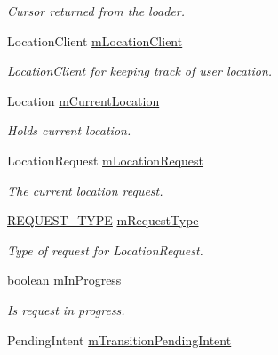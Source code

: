 \begin{DoxyCompactItemize}
\begin{DoxyCompactList}\small\item\em Cursor returned from the loader. \end{DoxyCompactList}\item 
Location\+Client \hyperlink{classuk_1_1ac_1_1swan_1_1digitaltrails_1_1activities_1_1_map_activity_ad65b4445612c08eb8fe55fde76dc3a01}{m\+Location\+Client}
\begin{DoxyCompactList}\small\item\em Location\+Client for keeping track of user location. \end{DoxyCompactList}\item 
Location \hyperlink{classuk_1_1ac_1_1swan_1_1digitaltrails_1_1activities_1_1_map_activity_a6bee4f44af3d6931f7a9d418b59b6262}{m\+Current\+Location}
\begin{DoxyCompactList}\small\item\em Holds current location. \end{DoxyCompactList}\item 
Location\+Request \hyperlink{classuk_1_1ac_1_1swan_1_1digitaltrails_1_1activities_1_1_map_activity_a277671a16bab76f50d1fe79d675f4128}{m\+Location\+Request}
\begin{DoxyCompactList}\small\item\em The current location request. \end{DoxyCompactList}\item 
\hyperlink{enumuk_1_1ac_1_1swan_1_1digitaltrails_1_1activities_1_1_map_activity_1_1_r_e_q_u_e_s_t___t_y_p_e}{R\+E\+Q\+U\+E\+S\+T\+\_\+\+T\+Y\+P\+E} \hyperlink{classuk_1_1ac_1_1swan_1_1digitaltrails_1_1activities_1_1_map_activity_a7ed4860060db37b8cc7752265331b5ba}{m\+Request\+Type}
\begin{DoxyCompactList}\small\item\em Type of request for Location\+Request. \end{DoxyCompactList}\item 
boolean \hyperlink{classuk_1_1ac_1_1swan_1_1digitaltrails_1_1activities_1_1_map_activity_a006890d3a00d0e4b64a0b8603de4b6df}{m\+In\+Progress}
\begin{DoxyCompactList}\small\item\em Is request in progress. \end{DoxyCompactList}\item 
Pending\+Intent \hyperlink{classuk_1_1ac_1_1swan_1_1digitaltrails_1_1activities_1_1_map_activity_ab9ae494241446e64b9d83b7aecc53855}{m\+Transition\+Pending\+Intent}

\end{DoxyCompactItemize}
